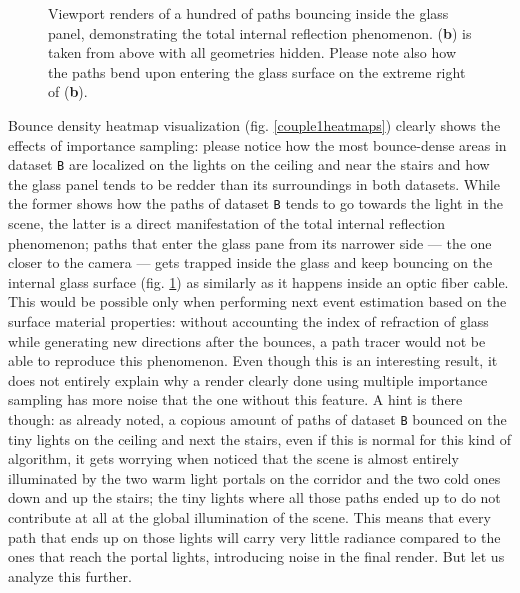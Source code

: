 \begin{figure}
	\caption{Viewport renders of a hundred of paths bouncing inside the glass panel, demonstrating the total internal reflection phenomenon. (\textbf{b}) is taken from above with all geometries hidden. Please note also how the paths bend upon entering the glass surface on the extreme right of (\textbf{b}).}
	\label{opticfiber}
\end{figure}

Bounce density heatmap visualization (fig. \ref{couple1heatmaps}) clearly shows the effects of importance sampling: please notice how the most bounce-dense areas in dataset \texttt{B} are localized on the lights on the ceiling and near the stairs and how the glass panel tends to be redder than its surroundings in both datasets. While the former shows how the paths of dataset \texttt{B} tends to go towards the light in the scene, the latter is a direct manifestation of the total internal reflection phenomenon; paths that enter the glass pane from its narrower side --- the one closer to the camera --- gets trapped inside the glass and keep bouncing on the internal glass surface (fig. \ref{opticfiber}) as similarly as it happens inside an optic fiber cable. This would be possible only when performing next event estimation based on the surface material properties: without accounting the index of refraction of glass while generating new directions after the bounces, a path tracer would not be able to reproduce this phenomenon. Even though this is an interesting result, it does not entirely explain why a render clearly done using multiple importance sampling has more noise that the one without this feature. A hint is there though: as already noted, a copious amount of paths of dataset \texttt{B} bounced on the tiny lights on the ceiling and next the stairs, even if this is normal for this kind of algorithm, it gets worrying when noticed that the scene is almost entirely illuminated by the two warm light portals on the corridor and the two cold ones down and up the stairs; the tiny lights where all those paths ended up to do not contribute at all at the global illumination of the scene. This means that every path that ends up on those lights will carry very little radiance compared to the ones that reach the portal lights, introducing noise in the final render. But let us analyze this further.

